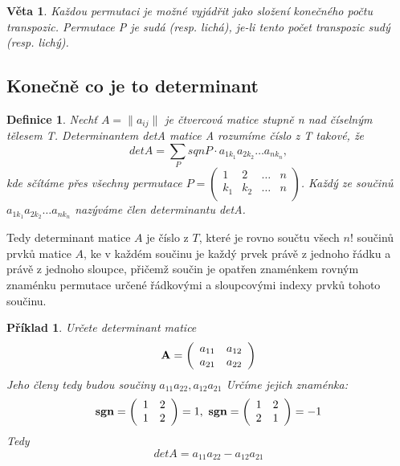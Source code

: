 \documentclass[12pt,a4paper]{article}
\newtheorem{definition}{Definice}
\newtheorem{sentence}{Věta}
\newtheorem{example}{Příklad}
\begin{document}
\begin{sentence}
	Každou permutaci je možné vyjádřit jako složení konečného počtu transpozic. Permutace P je sudá (resp. lichá), je-li tento počet transpozic sudý (resp. lichý).
\end{sentence}

\subsection{Konečně co je to determinant}
\begin{definition}
	Nechť $A = \| a_{ij} \|$ je čtvercová matice stupně n nad číselným tělesem T. Determinantem detA matice A rozumíme číslo z T takové, že $$detA =  \sum_P sqnP \cdot a_{1k_1}a_{2k_2} \dots a_{nk_n},$$ kde sčítáme přes všechny permutace $P = \left( \begin{array}{cccc} 1 & 2 & \dots & n\\ k_1 & k_2 & \dots & n \\ \end{array} \right)$. Každý ze součinů \\$a_{1k_1}a_{2k_2} \dots a_{nk_n}$ nazýváme člen determinantu detA.
\end{definition}
Tedy determinant matice $A$ je číslo z $T$, které je rovno součtu všech $n!$ součinů prvků matice $A$, ke v každém součinu je každý prvek právě z jednoho řádku a právě z jednoho sloupce, přičemž součin je opatřen znaménkem rovným znaménku permutace určené řádkovými a sloupcovými indexy prvků tohoto součinu.

\begin{example}
	Určete determinant matice
	\begin{displaymath}
{\bf A} =
\left( \begin{array}{cc}
a_{11} & a_{12}  \\
a_{21} & a_{22}  \\
\end{array} \right)
\end{displaymath}
Jeho členy tedy budou součiny $a_{11}a_{22}, a_{12}a_{21}$ Určíme jejich znaménka:
	\begin{displaymath}
{\bf sgn} =
\left( \begin{array}{cc} 1 & 2  \\ 1 & 2  \\ \end{array} \right) = 1,\
{\bf sgn} = \left( \begin{array}{cc} 1 & 2  \\ 2 & 1 \\ \end{array} \right) = -1
\end{displaymath}
Tedy $$detA = a_{11}a_{22} - a_{12}a_{21}$$
\end{example}
\end{document}
